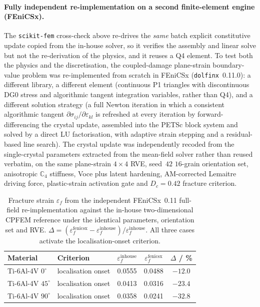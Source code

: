 \documentclass[11pt,a4paper,twocolumn]{article}
\providecommand{\ang}[1]{\ensuremath{#1^{\circ}}}
\begin{document}
\paragraph{Fully independent re-implementation on a second finite-element engine (FEniCSx).}
The \texttt{scikit-fem} cross-check above re-drives the \emph{same} batch explicit constitutive update copied
from the in-house solver, so it verifies the assembly and linear solve but not the re-derivation of the
physics, and it reuses a Q4 element. To test both the physics and the discretisation, the coupled-damage
plane-strain boundary-value problem was re-implemented from scratch in FEniCSx (\texttt{dolfinx}~0.11.0): a
different library, a different element (continuous P1 triangles with discontinuous DG0 stress and algorithmic
tangent integration variables, rather than Q4), and a different solution strategy (a full Newton iteration in
which a consistent algorithmic tangent $\partial\sigma_{ij}/\partial\varepsilon_{kl}$ is refreshed at every
iteration by forward-differencing the crystal update, assembled into the PETSc block system and solved by a
direct LU factorisation, with adaptive strain stepping and a residual-based line search). The crystal update
was independently recoded from the single-crystal parameters extracted from the mean-field solver rather than
reused verbatim, on the same plane-strain $4\times4$ RVE, seed~$42$ $16$-grain orientation set, anisotropic
$\mathbb{C}_4$ stiffness, Voce plus latent hardening, AM-corrected Lemaitre driving force, plastic-strain
activation gate and $D_c = 0.42$ fracture criterion.

\begin{table}[tp]
\centering
\caption{Fracture strain $\varepsilon_f$ from the independent FEniCSx~0.11 full-field re-implementation
against the in-house two-dimensional CPFEM reference under the identical parameters, orientation set and
RVE. $\Delta = (\varepsilon_f^{\mathrm{fenicsx}}-\varepsilon_f^{\mathrm{inhouse}})/\varepsilon_f^{\mathrm{inhouse}}$. All three cases activate the localisation-onset criterion.}
\label{tab:si_fenicsx}
\footnotesize
\begin{tabular}{llccc}
\toprule
\textbf{Material} & \textbf{Criterion} & $\varepsilon_f^{\mathrm{inhouse}}$ & $\varepsilon_f^{\mathrm{fenicsx}}$ & $\Delta$ / \% \\
\midrule
Ti-6Al-4V $\ang{0}$  & localisation onset & 0.0555 & 0.0488 & $-12.0$ \\
Ti-6Al-4V $\ang{45}$ & localisation onset & 0.0413 & 0.0316 & $-23.4$ \\
Ti-6Al-4V $\ang{90}$ & localisation onset & 0.0358 & 0.0241 & $-32.8$ \\
\bottomrule
\end{tabular}
\end{table}
\end{document}
